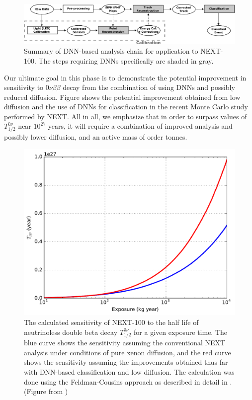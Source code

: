 \documentclass[11pt,a4paper]{article}
\begin{document}
\begin{figure}[!htb]
	\centering
	\includegraphics[scale=0.18]{fig/analysis_diagram.pdf}
	\caption{\label{fig.analysis}Summary of DNN-based analysis chain for application to NEXT-100. The steps requiring DNNs specifically are shaded in gray.}
\end{figure}

Our ultimate goal in this phase is to demonstrate the potential improvement in sensitivity to $0\nu\beta\beta$ decay from the combination of using DNNs and possibly reduced diffusion. Figure shows the potential improvement obtained from low diffusion and the use of DNNs for classification in the recent Monte Carlo study \cite{NEXT_DNN} performed by NEXT. All in all, we emphasize that in order to surpass values of $T^{0\nu}_{1/2}$ near $10^{27}$ years, it will require a combination of improved analysis and possibly lower diffusion, and an active mass of order tonnes.\\

\begin{figure}[!htb]
	\centering
	\includegraphics[scale=0.5]{fig/half_life_sensitivity.pdf}
	\caption{\label{fig.halflife}The calculated sensitivity of NEXT-100 to the half life of neutrinoless double beta decay $T^{0\nu}_{1/2}$ for a given exposure time. The blue curve shows the sensitivity assuming the conventional NEXT analysis under conditions of pure xenon diffusion, and the red curve shows the sensitivity assuming the improvements obtained thus far with DNN-based classification and low diffusion. The calculation was done using the Feldman-Cousins approach \cite{Feldman_1998} as described in detail in \cite{NEXT_sensitivity}. (Figure from \cite{NEXT_DNN})}
\end{figure}
\end{document}
